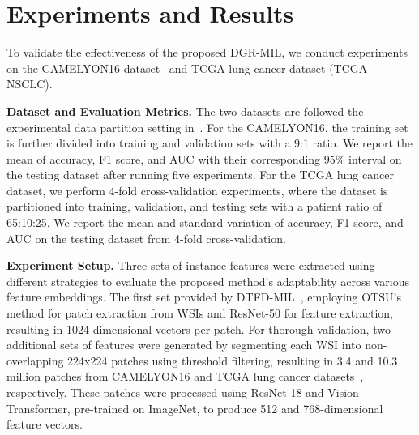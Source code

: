 \documentclass[runningheads]{llncs}
\begin{document}


\section{Experiments and Results}
To validate the effectiveness of the proposed DGR-MIL, we conduct experiments on the CAMELYON16 dataset~\cite{bejnordi2017diagnostic} and TCGA-lung cancer dataset (TCGA-NSCLC).

\noindent\textbf{Dataset and Evaluation Metrics.} The two datasets are followed the experimental data partition setting in~\cite{zhang2022dtfd}. For the CAMELYON16, the training set is further divided into training and validation sets with a 9:1 ratio. We report the mean of accuracy, F1 score, and AUC with their corresponding $95\%$ interval on the testing dataset after running five experiments. For the TCGA lung cancer dataset, we perform 4-fold cross-validation experiments, where the dataset is partitioned into training, validation, and testing sets with a patient ratio of 65:10:25.  We report the mean and standard variation of accuracy, F1 score, and AUC on the testing dataset from 4-fold cross-validation.

\noindent\textbf{Experiment Setup.}
Three sets of instance features were extracted using different strategies to evaluate the proposed method's adaptability across various feature embeddings. The first set provided by DTFD-MIL~\cite{zhang2022dtfd}, employing OTSU's method for patch extraction from WSIs and ResNet-50 for feature extraction, resulting in 1024-dimensional vectors per patch. For thorough validation, two additional sets of features were generated by segmenting each WSI into non-overlapping 224x224 patches using threshold filtering, resulting in 3.4 and 10.3 million patches from CAMELYON16 and TCGA lung cancer datasets~\cite{li2021dual,qiu2023sc,lin2023interventional,PDL}, respectively. These patches were processed using ResNet-18 and Vision Transformer, pre-trained on ImageNet, to produce 512 and 768-dimensional feature vectors.
\end{document}
